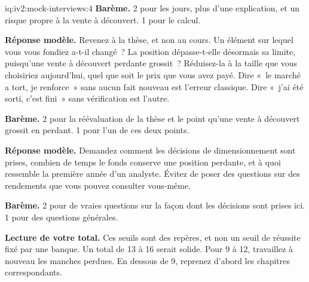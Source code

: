 \begin{solution}{iq:iv2:mock-interviews:4}
\textbf{Barème.} 2 pour les jours, plus d'une explication, et un risque propre à la vente à découvert. 1 pour le calcul.

\ivstop
\textbf{Réponse modèle.} Revenez à la thèse, et non au cours. Un élément sur lequel vous vous fondiez a-t-il changé~? La position dépasse-t-elle désormais sa limite, puisqu'une vente à découvert perdante grossit~? Réduisez-la à la taille que vous choisiriez aujourd'hui, quel que soit le prix que vous avez payé. Dire «~le marché a tort, je renforce~» sans aucun fait nouveau est l'erreur classique. Dire «~j'ai été sorti, c'est fini~» sans vérification est l'autre.

\textbf{Barème.} 2 pour la réévaluation de la thèse et le point qu'une vente à découvert grossit en perdant. 1 pour l'un de ces deux points.

\ivstop
\textbf{Réponse modèle.} Demandez comment les décisions de dimensionnement sont prises, combien de temps le fonds conserve une position perdante, et à quoi ressemble la première année d'un analyste. Évitez de poser des questions sur des rendements que vous pouvez consulter vous-même.

\textbf{Barème.} 2 pour de vraies questions sur la façon dont les décisions sont prises ici. 1 pour des questions générales.

\medskip
\textbf{Lecture de votre total.} Ces seuils sont des repères, et non un seuil de réussite fixé par une banque. Un total de 13 à 16 serait solide. Pour 9 à 12, travaillez à nouveau les manches perdues. En dessous de 9, reprenez d'abord les chapitres correspondants.

\end{solution}

